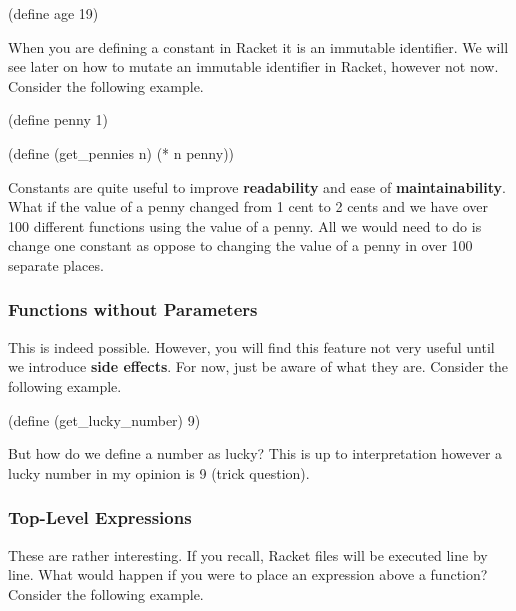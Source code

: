 \begin{code}[Lisp]
(define age 19)
\end{code}

When you are defining a constant in Racket it is an immutable identifier. We will see later on how to mutate an immutable identifier in Racket, however not now. Consider the following example.\\


\begin{code}[Lisp]
(define penny 1)

(define (get_pennies n)
	(* n penny))
\end{code}

Constants are quite useful to improve \textbf{readability} and ease of \textbf{maintainability}. What if the value of a penny changed from 1 cent to 2 cents and we have over 100 different functions using the value of a penny. All we would need to do is change one constant as oppose to changing the value of a penny in over 100 separate places.

\subsubsection*{Functions without Parameters}

This is indeed possible. However, you will find this feature not very useful until we introduce \textbf{side effects}. For now, just be aware of what they are. Consider the following example.\\


\begin{code}[Lisp]
(define (get_lucky_number)
	9)
\end{code}

But how do we define a number as lucky? This is up to interpretation however a lucky number in my opinion is 9 (trick question).

\subsubsection*{Top-Level Expressions}

These are rather interesting. If you recall, Racket files will be executed line by line. What would happen if you were to place an expression above a function? Consider the following example.\\

